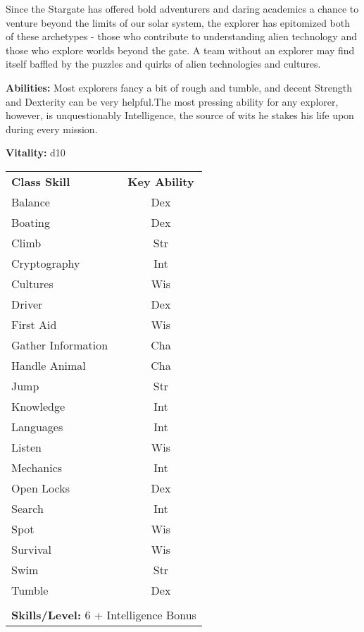 \begin{multicols}{2}

Since the Stargate has offered bold adventurers and daring academics a chance to venture beyond the limits of our solar system, the explorer has epitomized both of these archetypes - those who contribute to understanding alien technology and those who explore worlds beyond the gate. A team without an explorer may find itself baffled by the puzzles and quirks of alien technologies and cultures.

\textbf{Abilities:} Most explorers fancy a bit of rough and tumble, and decent Strength and Dexterity can be very helpful.The most pressing ability for any explorer, however, is unquestionably Intelligence, the source of wits he stakes his life upon during every mission.

\textbf{Vitality:} d10

\end{multicols}

\begin{table}[htb]
\raggedright
\begin{tabular}{l c}
\textbf{Class Skill} & \textbf{Key Ability}\\

Balance & Dex\\
Boating & Dex\\
Climb & Str\\
Cryptography & Int\\
Cultures & Wis\\
Driver & Dex\\
First Aid & Wis\\
Gather Information & Cha\\
Handle Animal & Cha\\
Jump & Str\\
Knowledge & Int\\
Languages & Int\\
Listen & Wis\\
Mechanics & Int\\
Open Locks & Dex\\
Search & Int\\
Spot & Wis\\
Survival & Wis\\
Swim & Str\\
Tumble & Dex\\

\multicolumn{2}{l}{\cellcolor{white}}\\
\multicolumn{2}{l}{\cellcolor{white}\textbf{Skills/Level:} 6 + Intelligence Bonus}\\
\end{tabular}
\end{table}

